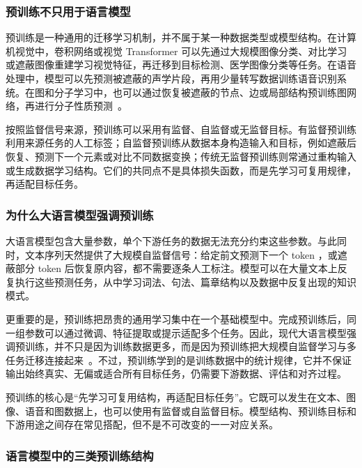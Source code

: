 \subsubsection{预训练不只用于语言模型}

预训练是一种通用的迁移学习机制，并不属于某一种数据类型或模型结构。在计算机视觉中，卷积网络或视觉 Transformer 可以先通过大规模图像分类、对比学习或遮蔽图像重建学习视觉特征，再迁移到目标检测、医学图像分类等任务。在语音处理中，模型可以先预测被遮蔽的声学片段，再用少量转写数据训练语音识别系统。在图和分子学习中，也可以通过恢复被遮蔽的节点、边或局部结构预训练图网络，再进行分子性质预测~\cite{ChenEtAl2020SimCLR,HeEtAl2022MAE,BaevskiEtAl2020Wav2vec}。

按照监督信号来源，预训练可以采用有监督、自监督或无监督目标。有监督预训练利用来源任务的人工标签；自监督预训练从数据本身构造输入和目标，例如遮蔽后恢复、预测下一个元素或对比不同数据变换；传统无监督预训练则常通过重构输入或生成数据学习结构。它们的共同点不是具体损失函数，而是先学习可复用规律，再适配目标任务。

\subsubsection{为什么大语言模型强调预训练}

大语言模型包含大量参数，单个下游任务的数据无法充分约束这些参数。与此同时，文本序列天然提供了大规模自监督信号：给定前文预测下一个 token ，或遮蔽部分 token 后恢复原内容，都不需要逐条人工标注。模型可以在大量文本上反复执行这些预测任务，从中学习词法、句法、篇章结构以及数据中反复出现的知识模式。

更重要的是，预训练把昂贵的通用学习集中在一个基础模型中。完成预训练后，同一组参数可以通过微调、特征提取或提示适配多个任务。因此，现代大语言模型强调预训练，并不只是因为训练数据更多，而是因为预训练把大规模自监督学习与多任务迁移连接起来~\cite{DevlinEtAl2019BERT,RaffelEtAl2020T5,BrownEtAl2020GPT3}。不过，预训练学到的是训练数据中的统计规律，它并不保证输出始终真实、无偏或适合所有目标任务，仍需要下游数据、评估和对齐过程。

\begin{importantnote}
  预训练的核心是“先学习可复用结构，再适配目标任务”。它既可以发生在文本、图像、语音和图数据上，也可以使用有监督或自监督目标。模型结构、预训练目标和下游用途之间存在常见搭配，但不是不可改变的一一对应关系。
\end{importantnote}

\subsubsection{语言模型中的三类预训练结构}

